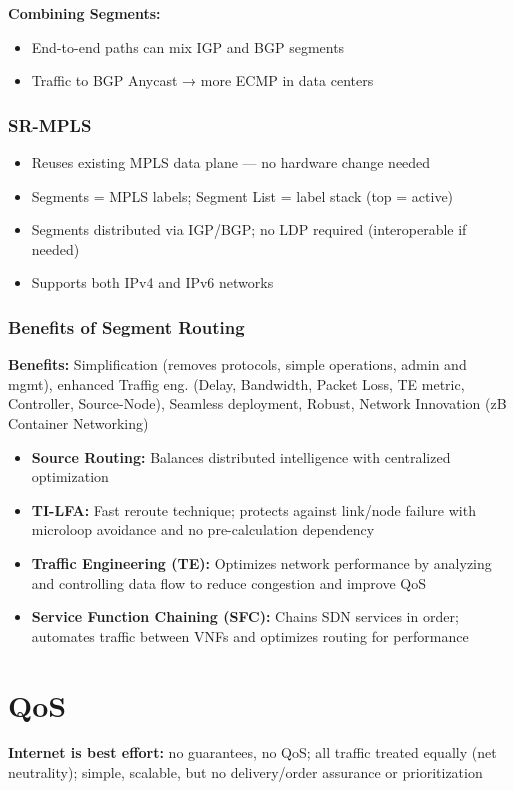 \begin{multicols*}{5}
		\textbf{Combining Segments:}
		\begin{itemize}
			\item End-to-end paths can mix IGP and BGP segments
			\item Traffic to BGP Anycast → more ECMP in data centers
		\end{itemize}
		
		\subsubsection{SR-MPLS}
		\begin{itemize}
			\item Reuses existing MPLS data plane — no hardware change needed
			\item Segments = MPLS labels; Segment List = label stack (top = active)
			\item Segments distributed via IGP/BGP; no LDP required (interoperable if needed)
			\item Supports both IPv4 and IPv6 networks
		\end{itemize}
		
		\subsubsection{Benefits of Segment Routing}
		\textbf{Benefits:} Simplification (removes protocols, simple operations, admin and mgmt), enhanced Traffig eng. (Delay, Bandwidth, Packet Loss, TE metric, Controller, Source-Node), Seamless deployment, Robust, Network Innovation (zB Container Networking)
		\begin{itemize}
			\item \textbf{Source Routing:} Balances distributed intelligence with centralized optimization
			\item \textbf{TI-LFA:} Fast reroute technique; protects against link/node failure with microloop avoidance and no pre-calculation dependency
			\item \textbf{Traffic Engineering (TE):} Optimizes network performance by analyzing and controlling data flow to reduce congestion and improve QoS
			\item \textbf{Service Function Chaining (SFC):} Chains SDN services in order; automates traffic between VNFs and optimizes routing for performance
		\end{itemize}
		
		\section{QoS}
		\textbf{Internet is best effort:} no guarantees, no QoS; all traffic treated equally (net neutrality); simple, scalable, but no delivery/order assurance or prioritization

\end{multicols*}
